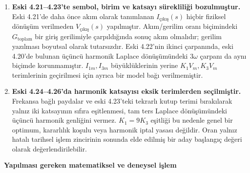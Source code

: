 \begin{enumerate}[leftmargin=*,label=\textbf{Yorum \arabic*:}]
  \item \textbf{Eski 4.21--4.23'te sembol, birim ve katsayı sürekliliği bozulmuştur.} Eski 4.21'de daha önce akım olarak tanımlanan $I_{\text{çıkış}}(s)$ hiçbir fiziksel dönüşüm verilmeden $V_{\text{çıkış}}(s)$ yapılmıştır. Akım/gerilim oranı biçimindeki $G_{\mathrm{toplam}}$ bir giriş gerilimiyle çarpıldığında sonuç akım olmalıdır; gerilim yazılması boyutsal olarak tutarsızdır. Eski 4.22'nin ikinci çarpanında, eski 4.20'de bulunan üçüncü harmonik Laplace dönüşümündeki $3\omega$ çarpanı da aynı biçimde korunmamıştır. $I_{1m},I_{3m}$ büyüklüklerinin yerine $K_1V_m,K_3V_m$ terimlerinin geçirilmesi için ayrıca bir model bağı verilmemiştir.

  \item \textbf{Eski 4.24--4.26'da harmonik katsayısı eksik terimlerden seçilmiştir.} Frekansa bağlı paydalar ve eski 4.23'teki tekrarlı kutup terimi bırakılarak yalnız iki katsayının sıfıra eşitlenmesi, tam ters Laplace dönüşümündeki üçüncü harmonik genliğini vermez. $K_1=9K_3$ eşitliği bu nedenle genel bir optimum, kararlılık koşulu veya harmonik iptal yasası değildir. Oran yalnız hatalı tarihsel işlem zincirinin sonunda elde edilmiş bir aday başlangıç değeri olarak değerlendirilebilir.
\end{enumerate}

\duzeltmeyoluetiketi\ \textbf{Yapılması gereken matematiksel ve deneysel işlem}

